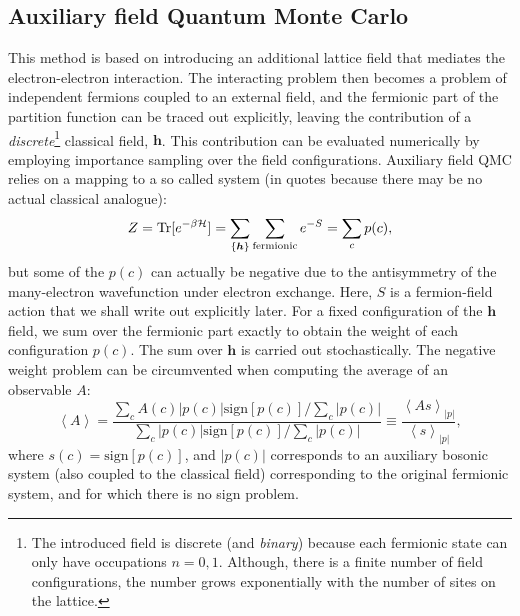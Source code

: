 \subsection{Auxiliary field Quantum Monte Carlo}
\label{sec:afqmc}
This method is based on introducing an additional lattice field that mediates the electron-electron interaction.
The interacting problem then becomes a problem of independent fermions coupled to an external field, and the fermionic part of the partition function can be traced out explicitly, leaving the contribution of a \emph{discrete}\footnote{The introduced field is discrete (and \emph{binary}) because each fermionic state can only have occupations $n = 0, 1$. Although, there is a finite number of field configurations, the number grows exponentially with the number of sites on the lattice.} classical field, $\bm h$.
This contribution can be evaluated numerically by employing importance sampling over the field configurations.
Auxiliary field QMC relies on a mapping to a so called  system (in quotes because there may be no actual classical analogue):
\begin{equation}\label{eq:Zsign}
Z = \operatorname{Tr} [ e^{-\beta \mathcal{H} } ] = \sum_{\{ \bm h\} } \sum_{\text{fermionic}} e^{-S} = \sum_c p (c) ,
\end{equation}
but some of the  $p(c)$ can actually be negative due to the antisymmetry of the many-electron wavefunction under electron exchange.
Here, $S$ is a fermion-field action that we shall write out explicitly later.
For a fixed configuration of the $\bm h$ field, we sum over the fermionic part exactly to obtain the weight of each configuration $p(c)$.
The sum over $\bm h$ is carried out stochastically.
The negative weight problem can be circumvented when computing the average of an observable $A$:
\begin{equation}\label{eq:signSampling}
\left\langle A \right\rangle = \frac{\sum_c A ( c )|  p ( c ) | \text{sign}[p(c)] / \sum_c | p ( c ) | }{\sum_c  |  p ( c ) | \text{sign}[p(c)] /  \sum_c | p ( c ) |} \equiv \frac{\left\langle A s \right\rangle_{|p|}}{\left\langle s \right\rangle_{|p|}} ,
\end{equation}
where $s(c) = \text{sign} [ p ( c ) ]$, and $| p ( c ) | $ corresponds to an auxiliary bosonic system (also coupled to the classical field) corresponding to the original fermionic system, and for which there is no sign problem.


